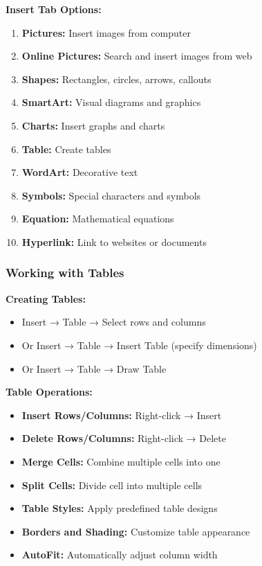 \documentclass[12pt,a4paper]{article}
\begin{document}
\textbf{Insert Tab Options:}
\begin{enumerate}
    \item \textbf{Pictures:} Insert images from computer
    \item \textbf{Online Pictures:} Search and insert images from web
    \item \textbf{Shapes:} Rectangles, circles, arrows, callouts
    \item \textbf{SmartArt:} Visual diagrams and graphics
    \item \textbf{Charts:} Insert graphs and charts
    \item \textbf{Table:} Create tables
    \item \textbf{WordArt:} Decorative text
    \item \textbf{Symbols:} Special characters and symbols
    \item \textbf{Equation:} Mathematical equations
    \item \textbf{Hyperlink:} Link to websites or documents
\end{enumerate}

\subsubsection{Working with Tables}

\textbf{Creating Tables:}
\begin{itemize}
    \item Insert → Table → Select rows and columns
    \item Or Insert → Table → Insert Table (specify dimensions)
    \item Or Insert → Table → Draw Table
\end{itemize}

\textbf{Table Operations:}
\begin{itemize}
    \item \textbf{Insert Rows/Columns:} Right-click → Insert
    \item \textbf{Delete Rows/Columns:} Right-click → Delete
    \item \textbf{Merge Cells:} Combine multiple cells into one
    \item \textbf{Split Cells:} Divide cell into multiple cells
    \item \textbf{Table Styles:} Apply predefined table designs
    \item \textbf{Borders and Shading:} Customize table appearance
    \item \textbf{AutoFit:} Automatically adjust column width
\end{itemize}
\end{document}

